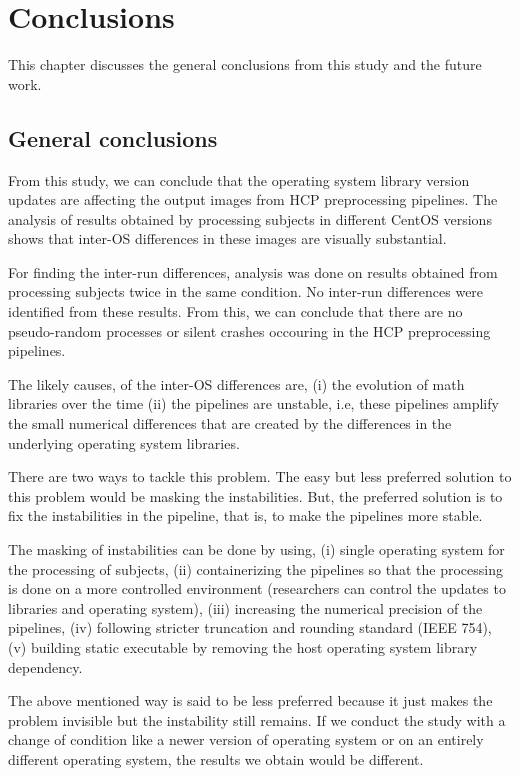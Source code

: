 \chapter{Conclusions}\label{conclusion}
This chapter discusses the general conclusions from this study and the future work.

\section{General conclusions}
From this study, we can conclude that the operating system library 
version updates are affecting the output images from HCP preprocessing 
pipelines. The analysis of results obtained by processing subjects in 
different CentOS versions shows that inter-OS differences in these 
images are visually substantial.

For finding the inter-run differences, analysis was done on results 
obtained from processing subjects twice in the same condition. No 
inter-run differences were identified from these results. From this, we 
can conclude that there are no pseudo-random processes or silent 
crashes occouring in the HCP preprocessing pipelines. 

The likely causes, of the inter-OS differences are, (i) the evolution 
of math libraries over the time (ii) the pipelines are unstable, i.e, 
these pipelines amplify the small numerical differences that are 
created by the differences in the underlying operating system 
libraries.

There are two ways to tackle this problem. The easy but less preferred 
solution to this problem would be masking the instabilities. But, the 
preferred solution is to fix the instabilities in the pipeline, that 
is, to make the pipelines more stable.

The masking of instabilities can be done by using, (i) single operating 
system for the processing of subjects, (ii) containerizing the 
pipelines so that the processing is done on a more controlled 
environment (researchers can control the updates to libraries and 
operating system), (iii) increasing the numerical precision of the 
pipelines, (iv) following stricter truncation and rounding standard 
(IEEE 754), (v) building static executable by removing the host 
operating system library dependency.

The above mentioned way is said to be less preferred because it just 
makes the problem invisible but the instability still remains. If we 
conduct the study with a change of condition like a newer version of 
operating system or on an entirely different operating system, the 
results we obtain would be different.

